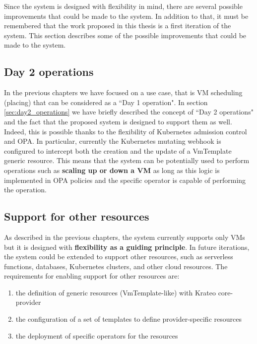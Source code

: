 Since the system is designed with flexibility in mind, there are several possible improvements that could be made to the system.
In addition to that, it must be remembered that the work proposed in this thesis is a first iteration of the system.
This section describes some of the possible improvements that could be made to the system.

\subsection{Day 2 operations}

In the previous chapters we have focused on a use case, that is VM scheduling (placing) that can be considered as a ``Day 1 operation".
In section \ref{sec:day2_operations} we have briefly described the concept of ``Day 2 operations" and the fact that the proposed system is designed to support them as well.
Indeed, this is possible thanks to the flexibility of Kubernetes admission control and OPA.
In particular, currently the Kubernetes mutating webhook is configured to intercept both the creation and the update of a VmTemplate generic resource.
This means that the system can be potentially used to perform operations such as \textbf{scaling up or down a VM} as long as this logic is implemented in OPA policies and the specific operator is capable of performing the operation.

\subsection{Support for other resources}
\label{sec:support_other_resources}

As described in the previous chapters, the system currently supports only VMs but it is designed with \textbf{flexibility as a guiding principle}.
In future iterations, the system could be extended to support other resources, such as serverless functions, databases, Kubernetes clusters, and other cloud resources.
The requirements for enabling support for other resources are: 
\begin{enumerate}
    \item the definition of generic resources (VmTemplate-like) with Krateo core-provider
    \item the configuration of a set of templates to define provider-specific resources
    \item the deployment of specific operators for the resources
\end{enumerate}

